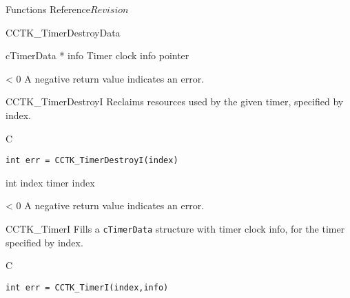 \begin{cactuspart}{ Functions Reference}{}{$Revision$}
\begin{FunctionDescription}{CCTK\_TimerDestroyData}
\begin{ParameterSection}
\begin{Parameter} {cTimerData * info}
Timer clock info pointer
\end{Parameter}
\end{ParameterSection}

\begin{ErrorSection}
\begin{Error}{< 0}
A negative return value indicates an error.
\end{Error}
\end{ErrorSection}
\end{FunctionDescription}


\begin{FunctionDescription}{CCTK\_TimerDestroyI}
\label{CCTK-TimerDestroyI}
Reclaims resources used by the
given timer, specified by index.
\begin{SynopsisSection}
\begin{Synopsis}{C}
\begin{verbatim}
int err = CCTK_TimerDestroyI(index)
\end{verbatim}
\end{Synopsis}
\end{SynopsisSection}

\begin{ParameterSection}
\begin{Parameter} {int index}
timer index
\end{Parameter}
\end{ParameterSection}

\begin{ErrorSection}
\begin{Error}{< 0}
A negative return value indicates an error.
\end{Error}
\end{ErrorSection}
\end{FunctionDescription}


\begin{FunctionDescription}{CCTK\_TimerI}
\label{CCTK-TimerI}
Fills a {\tt cTimerData}
structure with timer clock info, for the timer specified by index.
\begin{SynopsisSection}
\begin{Synopsis}{C}
\begin{verbatim}
int err = CCTK_TimerI(index,info)
\end{verbatim}
\end{Synopsis}
\end{SynopsisSection}


\end{FunctionDescription}
\end{cactuspart}
